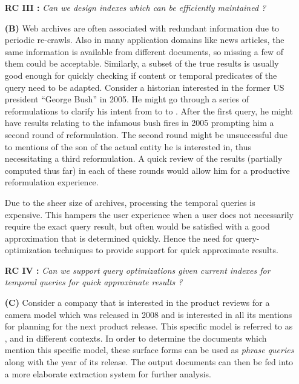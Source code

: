 \begin{enumerate}
\textbf{RC III :} \textit{Can we design indexes which can be efficiently maintained ?}
 

\item[\textbf{(B)}] Web archives are often associated with redundant information due to periodic re-crawls. Also in many application domains like news articles, the same information is available from different documents, so missing a few of them could be acceptable. Similarly, a subset of the true results is usually good enough for quickly checking if content or temporal predicates of the query need to be adapted. Consider a historian interested in the former US president ``\textsf{George Bush}'' in 2005. He might go through a series of reformulations to clarify his intent from  to  to . After the first query, he might have results relating to the infamous bush fires in 2005 prompting him a second round of reformulation. The second round might be unsuccessful due to mentions of the son of the actual entity he is interested in, thus necessitating a third reformulation. A quick review of the results (partially computed thus far) in each of these rounds would allow him for a productive reformulation experience.

Due to the sheer size of archives, processing the temporal queries is expensive. This hampers the user experience when a user does not necessarily require the exact query result, but often would be satisfied with a good approximation that is determined quickly. Hence the need for query-optimization techniques to provide support for quick approximate results.

\textbf{RC IV :} \textit{Can we support query optimizations given current indexes for temporal queries for quick approximate results ?}

\item[\textbf{(C)}] Consider a company that is interested in the product reviews for a camera model  which was released in 2008 and is interested in all its mentions for planning for the next product release. This specific model is referred to as ,  and  in different contexts. In order to determine the documents which mention this specific model, these surface forms can be used as \emph{phrase queries} along with the year of its release. The output documents can then be fed into a more elaborate extraction system for further analysis.


\end{enumerate}
